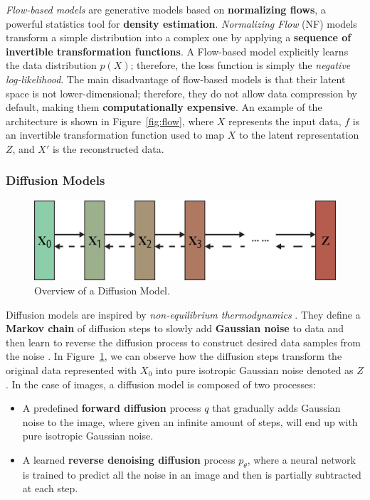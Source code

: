 \documentclass[preprint]{elsarticle}
\begin{document}
\emph{Flow-based models} \cite{weng2018flow} are generative models based on \textbf{normalizing flows}, a powerful statistics tool for \textbf{density estimation}.
\emph{Normalizing Flow} (NF) \cite{rezende2016variational} models transform a simple distribution into a complex one by applying a \textbf{sequence of invertible transformation functions}. 
A Flow-based model explicitly learns the data distribution $p(X)$; therefore, the loss function is simply the \emph{negative log-likelihood}.
The main disadvantage of flow-based models is that their latent space is not lower-dimensional;  therefore, they do not allow data compression by default, making them \textbf{computationally expensive}. An example of the architecture is shown in Figure~\ref{fig:flow}, where $X$ represents the input data, $f$ is an invertible transformation function used to map $X$ to the latent representation $Z$, and $X'$ is the reconstructed data.  


\subsubsection{Diffusion Models} \label{sec:diff}

\begin{figure}[t]
	\centering
    \includegraphics[scale=0.8]{img/svg/DIFF.png}
    \caption{Overview of a Diffusion Model.}\label{fig:diff-arch}
\end{figure}


Diffusion models are inspired by \emph{non-equilibrium thermodynamics} \cite{V_n_2020}. 
They define a \textbf{Markov chain} of diffusion steps to slowly 
add \textbf{Gaussian noise} to data and then learn to reverse the diffusion process to construct desired data samples from the noise \cite{weng2021diffusion}. 
In Figure~\ref{fig:diff-arch}, we can observe how the diffusion steps transform the original data represented with $X_0$ into pure isotropic Gaussian noise denoted as $Z$. 
In the case of images, a diffusion model is composed of two processes:
\begin{itemize}
	\item A predefined \textbf{forward diffusion} process $q$ that gradually adds Gaussian noise to the image, where given an infinite amount of steps, will end up with pure isotropic Gaussian noise. 
	\item A learned \textbf{reverse denoising diffusion} process $p_\theta$, where a neural network is trained to predict all the noise in an image and then is partially subtracted at each step.
\end{itemize}
\end{document}
